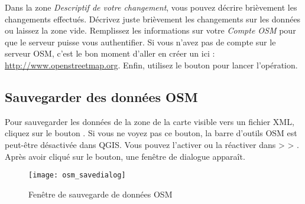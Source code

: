 Dans la zone \textit{Descriptif de votre changement}, vous pouvez décrire brièvement les changements effectués. Décrivez juste brièvement les changements sur les données ou laissez la zone vide.
Remplissez les informations sur votre \textit{Compte OSM} pour que le serveur puisse vous authentifier. Si vous n'avez pas de compte sur le serveur OSM, c'est le bon moment d'aller en créer un ici : \url{http://www.openstreetmap.org}. Enfin, utilisez le bouton  pour lancer l'opération.

\subsection{Sauvegarder des données OSM}  

Pour sauvegarder les données de la zone de la carte visible vers un fichier XML, cliquez sur le bouton . Si vous ne voyez pas ce bouton, la barre d'outils OSM est peut-être désactivée dans QGIS. Vous pouvez l'activer ou la réactiver dans  >  > . Après avoir cliqué sur le bouton, une fenêtre de dialogue apparaît.

\begin{figure}[ht]
   \centering
   \texttt{[image: osm\_savedialog]}   
   \caption{Fenêtre de sauvegarde de données OSM \nixcaption}\label{fig:osmsave}
\end{figure}

